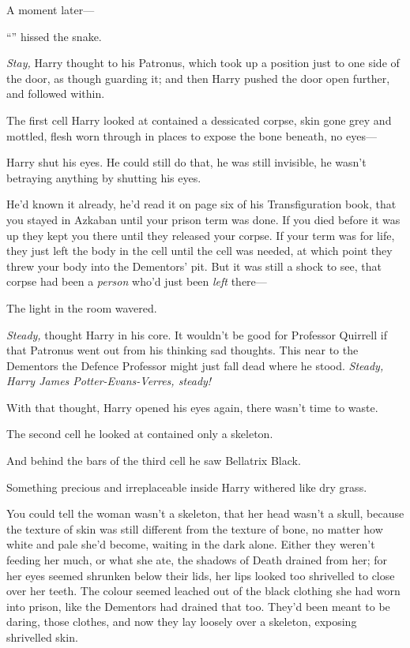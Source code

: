 A moment later—

“” hissed the snake.

\emph{Stay,} Harry thought to his Patronus, which took up a position just to one side of the door, as though guarding it; and then Harry pushed the door open further, and followed within.

The first cell Harry looked at contained a dessicated corpse, skin gone grey and mottled, flesh worn through in places to expose the bone beneath, no eyes—

Harry shut his eyes. He could still do that, he was still invisible, he wasn’t betraying anything by shutting his eyes.

He’d known it already, he’d read it on page six of his Transfiguration book, that you stayed in Azkaban until your prison term was done. If you died before it was up they kept you there until they released your corpse. If your term was for life, they just left the body in the cell until the cell was needed, at which point they threw your body into the Dementors’ pit. But it was still a shock to see, that corpse had been a \emph{person} who’d just been \emph{left} there—

The light in the room wavered.

\emph{Steady,} thought Harry in his core. It wouldn’t be good for Professor Quirrell if that Patronus went out from his thinking sad thoughts. This near to the Dementors the Defence Professor might just fall dead where he stood. \emph{Steady, Harry James Potter-Evans-Verres, steady!}

With that thought, Harry opened his eyes again, there wasn’t time to waste.

The second cell he looked at contained only a skeleton.

And behind the bars of the third cell he saw Bellatrix Black.

Something precious and irreplaceable inside Harry withered like dry grass.

You could tell the woman wasn’t a skeleton, that her head wasn’t a skull, because the texture of skin was still different from the texture of bone, no matter how white and pale she’d become, waiting in the dark alone. Either they weren’t feeding her much, or what she ate, the shadows of Death drained from her; for her eyes seemed shrunken below their lids, her lips looked too shrivelled to close over her teeth. The colour seemed leached out of the black clothing she had worn into prison, like the Dementors had drained that too. They’d been meant to be daring, those clothes, and now they lay loosely over a skeleton, exposing shrivelled skin.

